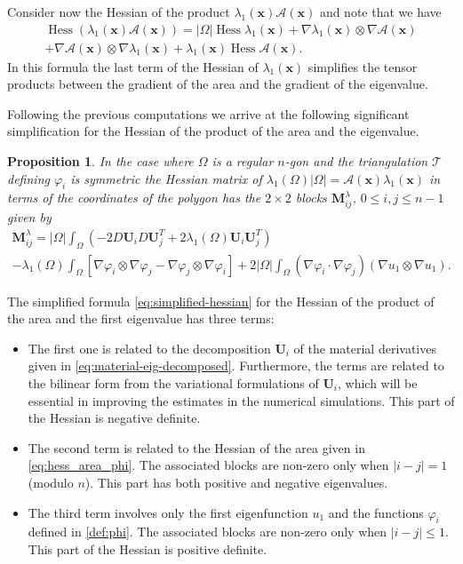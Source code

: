 \documentclass[JEP,XML,SOM,Unicode,ThmDefs,NoFloatCountersInSection,published]{cedram}
\theoremstyle{plain}
\newtheorem{propo}[thm]{Proposition}
\theoremstyle{definition}
\newcommand{\bo}[1]{{\boldsymbol#1}}
\newcommand{\Hess}{\operatorname{Hess}}
\begin{document}
Consider now the Hessian of the product $\lambda_1(\bo x)\mathcal A(\bo x)$ and note that we have
\vspace*{-5pt}
\begin{multline*}
\Hess (\lambda_1(\bo x)\mathcal A(\bo x)) = |\Omega|\Hess \lambda_1(\bo x)+\nabla \lambda_1(\bo x) \otimes \nabla \mathcal A(\bo x)\\ +
\nabla \mathcal A(\bo x)\otimes \nabla \lambda_1(\bo x) + \lambda_1 (\bo x) \Hess \mathcal A(\bo x).
\end{multline*}
In this formula the last term of the Hessian of $\lambda_1(\bo x)$ simplifies the tensor products between the gradient of the area and the gradient of the eigenvalue.

Following the previous computations we arrive at the following significant simplification for the Hessian of the product of the area and the eigenvalue.

\begin{propo}
In the case where $\Omega$ is a regular $n$-gon and the triangulation $\mathcal T$ defining $\varphi_i$ is symmetric the Hessian matrix of $\lambda_1(\Omega)|\Omega|= \mathcal A(\bo x) \lambda_1(\bo x)$ in terms of the coordinates of the polygon has the $2\times 2$ blocks $\bo M_{ij}^\lambda$, $0\leq i,j \leq n-1$ given by
\vspace*{-7pt}\enlargethispage{.5\baselineskip}
\begin{multline}
\label{eq:simplified-hessian}
\bo M_{ij}^\lambda = |\Omega|\int_\Omega (-2D\bo U_i D\bo U_j^T+ 2\lambda_1(\Omega)\bo U_i\bo U_j^T) \\
 -\lambda_1(\Omega)\int_\Omega [ \nabla \varphi_i \otimes \nabla \varphi_j - \nabla \varphi_j \otimes \nabla \varphi_i]+2|\Omega|\int_\Omega (\nabla \varphi_i \cdot \nabla \varphi_j)(\nabla u_1 \otimes \nabla u_1) .
\end{multline}
\end{propo}

The simplified formula \eqref{eq:simplified-hessian} for the Hessian of the product of the area and the first eigenvalue has three terms:
\begin{itemize}
\item The first one is related to the decomposition $\bo U_i$ of the material derivatives given in \eqref{eq:material-eig-decomposed}. Furthermore, the terms are related to the bilinear form from the variational formulations of $\bo U_i$, which will be essential in improving the estimates in the numerical simulations. This part of the Hessian is negative definite.
\item The second term is related to the Hessian of the area given in \eqref{eq:hess_area_phi}. The asso\-ciated blocks are non-zero only when $|i-j|=1$ (modulo $n$). This part has both positive and negative eigenvalues.
\item The third term involves only the first eigenfunction $u_1$ and the functions $\varphi_i$ defined in \eqref{def:phi}. The associated blocks are non-zero only when $|i-j|\leq 1$. This part of the Hessian is positive definite.
\end{itemize}
\end{document}
